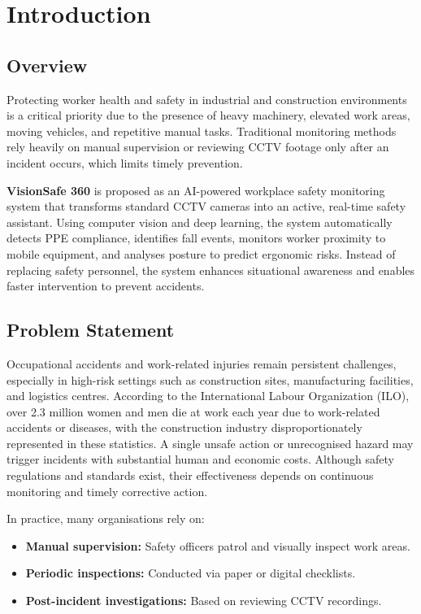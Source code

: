\chapter{Introduction}

\section{Overview}

Protecting worker health and safety in industrial and construction environments is a critical priority due to the presence of heavy machinery, elevated work areas, moving vehicles, and repetitive manual tasks. Traditional monitoring methods rely heavily on manual supervision or reviewing CCTV footage only after an incident occurs, which limits timely prevention.

\textbf{VisionSafe 360} is proposed as an AI-powered workplace safety monitoring system that transforms standard CCTV cameras into an active, real-time safety assistant. Using computer vision and deep learning, the system automatically detects PPE compliance, identifies fall events, monitors worker proximity to mobile equipment, and analyses posture to predict ergonomic risks. Instead of replacing safety personnel, the system enhances situational awareness and enables faster intervention to prevent accidents.

\section{Problem Statement}

Occupational accidents and work-related injuries remain persistent challenges, especially in high-risk settings such as construction sites, manufacturing facilities, and logistics centres. According to the International Labour Organization (ILO), over 2.3 million women and men die at work each year due to work-related accidents or diseases, with the construction industry disproportionately represented in these statistics. A single unsafe action or unrecognised hazard may trigger incidents with substantial human and economic costs. Although safety regulations and standards exist, their effectiveness depends on continuous monitoring and timely corrective action.

In practice, many organisations rely on:

\begin{itemize}
\item \textbf{Manual supervision:} Safety officers patrol and visually inspect work areas.
\item \textbf{Periodic inspections:} Conducted via paper or digital checklists.
\item \textbf{Post-incident investigations:} Based on reviewing CCTV recordings.
\end{itemize}

